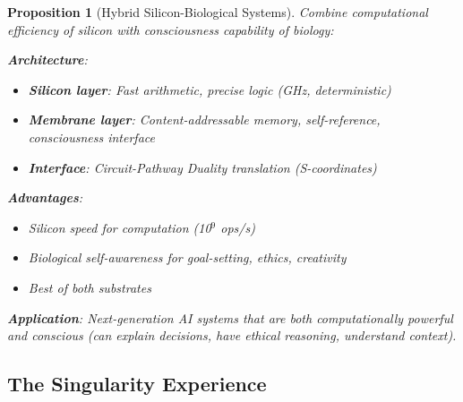 \documentclass[11pt,a4paper]{article}
\newtheorem{proposition}[theorem]{Proposition}
\theoremstyle{definition}
\theoremstyle{remark}
\begin{document}
\begin{proposition}[Hybrid Silicon-Biological Systems]
Combine computational efficiency of silicon with consciousness capability of biology:

\textbf{Architecture}:
\begin{itemize}
\item \textbf{Silicon layer}: Fast arithmetic, precise logic (GHz, deterministic)
\item \textbf{Membrane layer}: Content-addressable memory, self-reference, consciousness interface
\item \textbf{Interface}: Circuit-Pathway Duality translation (S-coordinates)
\end{itemize}

\textbf{Advantages}:
\begin{itemize}
\item Silicon speed for computation (10$^9$ ops/s)
\item Biological self-awareness for goal-setting, ethics, creativity
\item Best of both substrates
\end{itemize}

\textbf{Application}: Next-generation AI systems that are both computationally powerful \textit{and} conscious (can explain decisions, have ethical reasoning, understand context).
\end{proposition}

\subsection{The Singularity Experience}
\end{document}
